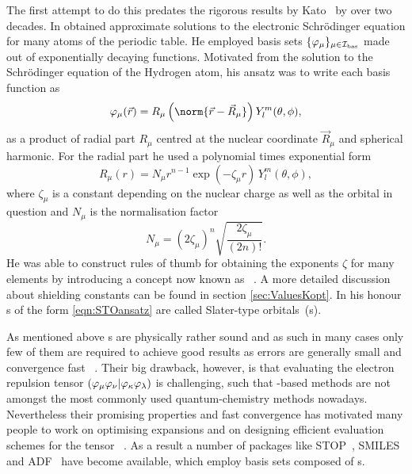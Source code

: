 The first attempt to do this predates the rigorous results by Kato~\cite{Kato1951,Kato1957}
by over two decades.
In \citeyear{Slater1930} \citet{Slater1930}
obtained approximate solutions to the electronic Schrödinger equation
for many atoms of the periodic table.
He employed basis sets $\{\varphi_\mu\}_{\mu\in\mathcal{I}_\text{bas}}$
made out of exponentially decaying functions.
Motivated from the solution to the Schrödinger equation of the Hydrogen atom,
his ansatz was to write each basis function as
\begin{equation}
	\varphi_\mu(\vec{r}) = R_\mu\left(\norm{\vec{r} - \vec{R}_\mu}\right) Y_l^m(\theta, \phi),
	\label{eqn:STOansatz}
\end{equation}
\ie as a product of radial part $R_\mu$ centred at the nuclear
coordinate $\vec{R}_\mu$
and spherical harmonic.
For the radial part he used a polynomial times exponential form
\[ R_\mu(r) = N_\mu r^{n-1} \exp(-\zeta_\mu r) \, Y_l^m(\theta, \phi), \]
where $\zeta_\mu$ is a constant depending on the nuclear charge as well as
the orbital in question and
$N_\mu$ is the normalisation factor
\[ N_\mu = \left( 2\zeta_\mu \right)^n \sqrt{\frac{2\zeta_\mu}{(2n)!}}. \]
He was able to construct rules of thumb for obtaining the exponents $\zeta$
for many elements by introducing
a concept now known as ~\cite{Slater1930}.
A more detailed discussion about shielding constants
can be found in section \vref{sec:ValuesKopt}.
In his honour {\ETO}s of the form \eqref{eqn:STOansatz} are called Slater-type orbitals~({\STO}s).

As mentioned above {\STO}s are physically rather sound
and as such in many cases only few of them are required to achieve good results
as errors are generally small and convergence fast%
~\cite{Shepard2007,Guell2008,Hoggan2009,Hoggan2011}.
Their big drawback, however,
is that evaluating the electron repulsion tensor
$\left( \varphi_\mu \varphi_\nu \middle| \varphi_\kappa \varphi_\lambda \right)$
is challenging,
such that \STO-based methods
are not amongst the most commonly used quantum-chemistry methods nowadays.
Nevertheless their promising properties and fast convergence
has motivated many people to work on optimising \STO expansions
and on designing efficient evaluation schemes for the \ERI tensor%
~\cite{Weniger1983,Hoggan2009,Hoggan2011,Avery2013,Avery2017}.
As a result a number of packages
like STOP~\cite{Bouferguene1996},
SMILES~\cite{FernandezRico2001}
and ADF~\cite{Velde2001}
have become available,
which employ basis sets composed of {\STO}s.
